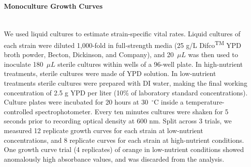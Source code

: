 \paragraph*{Monoculture Growth Curves}\mbox{}\\
We used liquid cultures to estimate strain-specific vital rates. Liquid cultures of each strain were diluted 1,000-fold in full-strength media (25 g/L Difco\textsuperscript{TM} YPD broth powder, Becton, Dickinson, and Company), and 20~$\mu L$ was then used to inoculate 180~$\mu L$ sterile cultures within wells of a 96-well plate. In high-nutrient treatments, sterile cultures were made of YPD solution. In low-nutrient treatments sterile cultures were prepared with DI water, making the final working concentration of 2.5 g YPD per liter (10\% of laboratory standard concentrations). Culture plates were incubated for 20 hours at 30~$^\circ$C inside a temperature-controlled spectrophotometer. Every ten minutes cultures were shaken for 5 seconds prior to recording optical density at 600 nm. Split across 3 trials, we measured 12 replicate growth curves for each strain at low-nutrient concentrations, and 8 replicate curves for each strain at high-nutrient conditions. One growth curve trial (4 replicates) of orange in low-nutrient conditions showed anomalously high absorbance values, and was discarded from the analysis. 


